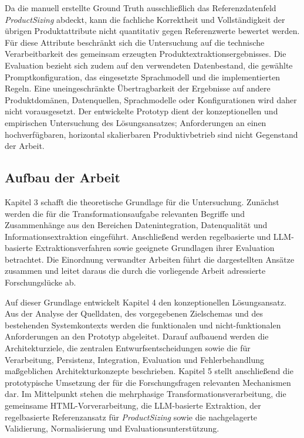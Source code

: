Da die manuell erstellte Ground Truth ausschließlich das Referenzdatenfeld \textit{ProductSizing} abdeckt, kann die fachliche Korrektheit und Vollständigkeit der übrigen Produktattribute nicht quantitativ gegen Referenzwerte bewertet werden. Für diese Attribute beschränkt sich die Untersuchung auf die technische Verarbeitbarkeit des gemeinsam erzeugten Produktextraktionsergebnisses. Die Evaluation bezieht sich zudem auf den verwendeten Datenbestand, die gewählte Promptkonfiguration, das eingesetzte Sprachmodell und die implementierten Regeln. Eine uneingeschränkte Übertragbarkeit der Ergebnisse auf andere Produktdomänen, Datenquellen, Sprachmodelle oder Konfigurationen wird daher nicht vorausgesetzt. Der entwickelte Prototyp dient der konzeptionellen und empirischen Untersuchung des Lösungsansatzes; Anforderungen an einen hochverfügbaren, horizontal skalierbaren Produktivbetrieb sind nicht Gegenstand der Arbeit.

\subsection{Aufbau der Arbeit}

Kapitel 3 schafft die theoretische Grundlage für die Untersuchung. Zunächst werden die für die Transformationsaufgabe relevanten Begriffe und Zusammenhänge aus den Bereichen Datenintegration, Datenqualität und Informationsextraktion eingeführt. Anschließend werden regelbasierte und LLM-basierte Extraktionsverfahren sowie geeignete Grundlagen ihrer Evaluation betrachtet. Die Einordnung verwandter Arbeiten führt die dargestellten Ansätze zusammen und leitet daraus die durch die vorliegende Arbeit adressierte Forschungslücke ab.

Auf dieser Grundlage entwickelt Kapitel 4 den konzeptionellen Lösungsansatz. Aus der Analyse der Quelldaten, des vorgegebenen Zielschemas und des bestehenden Systemkontexts werden die funktionalen und nicht-funktionalen Anforderungen an den Prototyp abgeleitet. Darauf aufbauend werden die Architekturziele, die zentralen Entwurfsentscheidungen sowie die für Verarbeitung, Persistenz, Integration, Evaluation und Fehlerbehandlung maßgeblichen Architekturkonzepte beschrieben. Kapitel 5 stellt anschließend die prototypische Umsetzung der für die Forschungsfragen relevanten Mechanismen dar. Im Mittelpunkt stehen die mehrphasige Transformationsverarbeitung, die gemeinsame HTML-Vorverarbeitung, die LLM-basierte Extraktion, der regelbasierte Referenzansatz für \textit{ProductSizing} sowie die nachgelagerte Validierung, Normalisierung und Evaluationsunterstützung.

